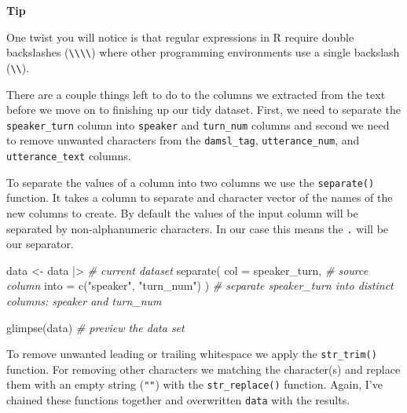 \documentclass[
  letterpaper,
  DIV=11,
  numbers=noendperiod]{scrreport}
\newenvironment{Shaded}{\begin{snugshade}}{\end{snugshade}}
\newcommand{\AttributeTok}[1]{\textcolor[rgb]{0.00,0.00,0.00}{#1}}
\newcommand{\CommentTok}[1]{\textcolor[rgb]{0.00,0.00,0.00}{\textit{#1}}}
\newcommand{\FunctionTok}[1]{\textcolor[rgb]{0.00,0.00,0.00}{#1}}
\newcommand{\NormalTok}[1]{\textcolor[rgb]{0.00,0.00,0.00}{#1}}
\newcommand{\OtherTok}[1]{\textcolor[rgb]{0.00,0.00,0.00}{#1}}
\newcommand{\SpecialCharTok}[1]{\textcolor[rgb]{0.00,0.00,0.00}{#1}}
\newcommand{\StringTok}[1]{\textcolor[rgb]{0.00,0.00,0.00}{#1}}
\theoremstyle{definition}
\theoremstyle{remark}
\begin{document}
\begin{tcolorbox}[enhanced jigsaw, breakable, arc=.35mm, leftrule=.75mm, rightrule=.15mm, colback=white, toprule=.15mm, bottomrule=.15mm, opacityback=0, left=2mm]

\textbf{ Tip}

One twist you will notice is that regular expressions in R require
double backslashes
(\texttt{\textbackslash{}\textbackslash{}\textbackslash{}\textbackslash{}})
where other programming environments use a single backslash
(\texttt{\textbackslash{}\textbackslash{}}).

\end{tcolorbox}

There are a couple things left to do to the columns we extracted from
the text before we move on to finishing up our tidy dataset. First, we
need to separate the \texttt{speaker\_turn} column into \texttt{speaker}
and \texttt{turn\_num} columns and second we need to remove unwanted
characters from the \texttt{damsl\_tag}, \texttt{utterance\_num}, and
\texttt{utterance\_text} columns.

To separate the values of a column into two columns we use the
\texttt{separate()} function. It takes a column to separate and
character vector of the names of the new columns to create. By default
the values of the input column will be separated by non-alphanumeric
characters. In our case this means the \texttt{.} will be our separator.

\begin{Shaded}
\begin{Highlighting}[]
\NormalTok{data }\OtherTok{\textless{}{-}}
\NormalTok{  data }\SpecialCharTok{|\textgreater{}} \CommentTok{\# current dataset}
  \FunctionTok{separate}\NormalTok{(}
    \AttributeTok{col =}\NormalTok{ speaker\_turn, }\CommentTok{\# source column}
    \AttributeTok{into =} \FunctionTok{c}\NormalTok{(}\StringTok{"speaker"}\NormalTok{, }\StringTok{"turn\_num"}\NormalTok{)}
\NormalTok{  ) }\CommentTok{\# separate speaker\_turn into distinct columns: speaker and turn\_num}

\FunctionTok{glimpse}\NormalTok{(data) }\CommentTok{\# preview the data set}
\end{Highlighting}
\end{Shaded}

To remove unwanted leading or trailing whitespace we apply the
\texttt{str\_trim()} function. For removing other characters we matching
the character(s) and replace them with an empty string (\texttt{""})
with the \texttt{str\_replace()} function. Again, I've chained these
functions together and overwritten \texttt{data} with the results.
\end{document}
